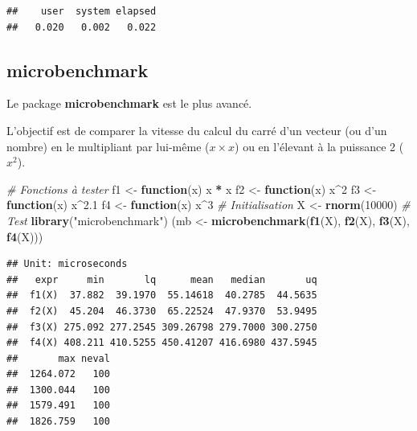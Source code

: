 \documentclass[
  12pt,
  french,
  a4paper,
  extrafontsizes,onecolumn,openright
  ]{memoir}
\newenvironment{Shaded}{\begin{snugshade}}{\end{snugshade}}
\newcommand{\CommentTok}[1]{\textcolor[rgb]{0.56,0.35,0.01}{\textit{#1}}}
\newcommand{\ControlFlowTok}[1]{\textcolor[rgb]{0.13,0.29,0.53}{\textbf{#1}}}
\newcommand{\DecValTok}[1]{\textcolor[rgb]{0.00,0.00,0.81}{#1}}
\newcommand{\FloatTok}[1]{\textcolor[rgb]{0.00,0.00,0.81}{#1}}
\newcommand{\KeywordTok}[1]{\textcolor[rgb]{0.13,0.29,0.53}{\textbf{#1}}}
\newcommand{\NormalTok}[1]{#1}
\newcommand{\OperatorTok}[1]{\textcolor[rgb]{0.81,0.36,0.00}{\textbf{#1}}}
\newcommand{\StringTok}[1]{\textcolor[rgb]{0.31,0.60,0.02}{#1}}
\begin{document}
\begin{verbatim}
##    user  system elapsed 
##   0.020   0.002   0.022
\end{verbatim}

\normalsize

\hypertarget{microbenchmark}{%
\subsection{microbenchmark}\label{microbenchmark}}

Le package \textbf{microbenchmark} est le plus avancé.

L'objectif est de comparer la vitesse du calcul du carré d'un vecteur (ou d'un nombre) en le multipliant par lui-même (\(x \times x\)) ou en l'élevant à la puissance 2 (\(x^2\)).

\scriptsize

\begin{Shaded}
\begin{Highlighting}[]
\CommentTok{# Fonctions à tester}
\NormalTok{f1 <-}\StringTok{ }\ControlFlowTok{function}\NormalTok{(x) x }\OperatorTok{*}\StringTok{ }\NormalTok{x}
\NormalTok{f2 <-}\StringTok{ }\ControlFlowTok{function}\NormalTok{(x) x}\OperatorTok{^}\DecValTok{2}
\NormalTok{f3 <-}\StringTok{ }\ControlFlowTok{function}\NormalTok{(x) x}\OperatorTok{^}\FloatTok{2.1}
\NormalTok{f4 <-}\StringTok{ }\ControlFlowTok{function}\NormalTok{(x) x}\OperatorTok{^}\DecValTok{3}
\CommentTok{# Initialisation}
\NormalTok{X <-}\StringTok{ }\KeywordTok{rnorm}\NormalTok{(}\DecValTok{10000}\NormalTok{)}
\CommentTok{# Test}
\KeywordTok{library}\NormalTok{(}\StringTok{"microbenchmark"}\NormalTok{)}
\NormalTok{(mb <-}\StringTok{ }\KeywordTok{microbenchmark}\NormalTok{(}\KeywordTok{f1}\NormalTok{(X), }\KeywordTok{f2}\NormalTok{(X), }\KeywordTok{f3}\NormalTok{(X), }\KeywordTok{f4}\NormalTok{(X)))}
\end{Highlighting}
\end{Shaded}

\begin{verbatim}
## Unit: microseconds
##   expr     min       lq      mean   median       uq
##  f1(X)  37.882  39.1970  55.14618  40.2785  44.5635
##  f2(X)  45.204  46.3730  65.22524  47.9370  53.9495
##  f3(X) 275.092 277.2545 309.26798 279.7000 300.2750
##  f4(X) 408.211 410.5255 450.41207 416.6980 437.5945
##       max neval
##  1264.072   100
##  1300.044   100
##  1579.491   100
##  1826.759   100
\end{verbatim}

\normalsize
\end{document}
